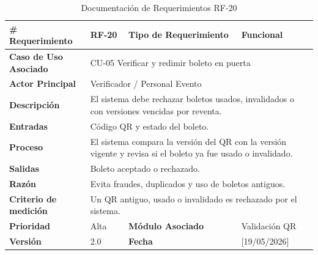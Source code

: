 \documentclass[12pt,letterpaper]{article}
\begin{document}
\begin{table}[H]
\centering
\scriptsize
\renewcommand{\arraystretch}{1.05}
\setlength{\tabcolsep}{3pt}

\newlength{\anchoceldaRFveinte}
\setlength{\anchoceldaRFveinte}{\dimexpr\textwidth-2.7cm-8\tabcolsep-5\arrayrulewidth\relax}

\begin{tabularx}{\textwidth}{|p{2.7cm}|X|p{2.8cm}|X|}
\hline
\textbf{\# Requerimiento} & RF-20 & \textbf{Tipo de Requerimiento} & Funcional \\ \hline

\textbf{Caso de Uso Asociado} & 
\multicolumn{3}{p{\anchoceldaRFveinte}|}{CU-05 Verificar y redimir boleto en puerta} \\ \hline

\textbf{Actor Principal} & 
\multicolumn{3}{p{\anchoceldaRFveinte}|}{Verificador / Personal Evento} \\ \hline

\textbf{Descripción} & 
\multicolumn{3}{p{\anchoceldaRFveinte}|}{El sistema debe rechazar boletos usados, invalidados o con versiones vencidas por reventa.} \\ \hline

\textbf{Entradas} & 
\multicolumn{3}{p{\anchoceldaRFveinte}|}{Código QR y estado del boleto.} \\ \hline

\textbf{Proceso} & 
\multicolumn{3}{p{\anchoceldaRFveinte}|}{El sistema compara la versión del QR con la versión vigente y revisa si el boleto ya fue usado o invalidado.} \\ \hline

\textbf{Salidas} & 
\multicolumn{3}{p{\anchoceldaRFveinte}|}{Boleto aceptado o rechazado.} \\ \hline

\textbf{Razón} & 
\multicolumn{3}{p{\anchoceldaRFveinte}|}{Evita fraudes, duplicados y uso de boletos antiguos.} \\ \hline

\textbf{Criterio de medición} & 
\multicolumn{3}{p{\anchoceldaRFveinte}|}{Un QR antiguo, usado o invalidado es rechazado por el sistema.} \\ \hline

\textbf{Prioridad} & Alta & \textbf{Módulo Asociado} & Validación QR \\ \hline

\textbf{Versión} & 2.0 & \textbf{Fecha} & [19/05/2026] \\ \hline

\end{tabularx}

\caption{Documentación de Requerimientos RF-20}
\label{tab:documentacion_requerimientos_rf20}
\normalsize
\end{table}
\end{document}
